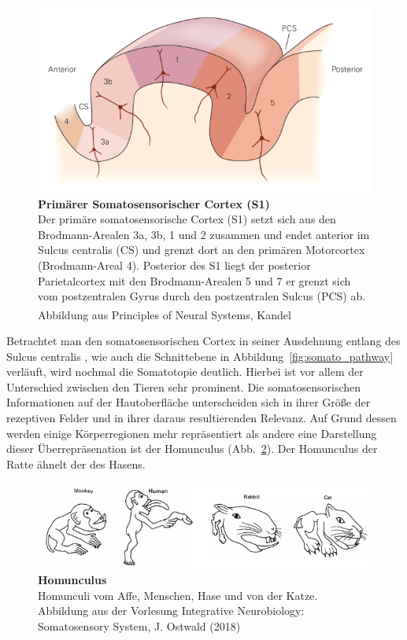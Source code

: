 \documentclass[12pt,a4paper,pdftex]{article}
\begin{document}
\begin{figure}[H]
    \centering
    \includegraphics{pictures/somatosensory/S1_Cortex.png}
    \caption[Primärer Somatosensorischer Cortex]{\textbf{Primärer Somatosensorischer Cortex (S1)}\\
    Der primäre somatosensorische Cortex (S1) setzt sich aus den Brodmann-Arealen 3a, 3b, 1 und 2 zusammen und endet anterior im Sulcus centralis (CS) und grenzt dort an den primären Motorcortex (Brodmann-Areal 4). Posterior des S1 liegt der posterior Parietalcortex mit den Brodmann-Arealen 5 und 7 er grenzt sich vom postzentralen Gyrus durch den postzentralen Sulcus (PCS) ab. Abbildung aus Principles of Neural Systems, Kandel
    \textsuperscript{\cite[23]{kandel2013principles}}}
    \label{fig:S1_Cortex}
\end{figure}

Betrachtet man den somatosensorischen Cortex in seiner Ausdehnung entlang des Sulcus centralis , wie auch die Schnittebene in Abbildung~\ref{fig:somato_pathway} verläuft, wird nochmal die Somatotopie  deutlich. Hierbei ist vor allem der Unterschied zwischen den Tieren sehr prominent. Die somatosensorischen Informationen auf der Hautoberfläche unterscheiden sich in ihrer Größe der rezeptiven Felder und in ihrer daraus resultierenden Relevanz. Auf Grund dessen werden einige Körperregionen mehr repräsentiert als andere eine Darstellung dieser Überrepräsenation ist der Homunculus (Abb.~\ref{fig:somato_homunculus}). Der Homunculus  der Ratte ähnelt der des Hasens.
\\

\begin{figure}[H]
    \centering
    \includegraphics[width = \textwidth] {pictures/somatosensory/homunculus.png}
    \caption[Homunculus]{\textbf{Homunculus}\\
    Homunculi vom Affe, Menschen, Hase und von der Katze. Abbildung aus der Vorlesung Integrative Neurobiology: Somatosensory System, J. Ostwald (2018)}
    \label{fig:somato_homunculus}
\end{figure}
\end{document}
